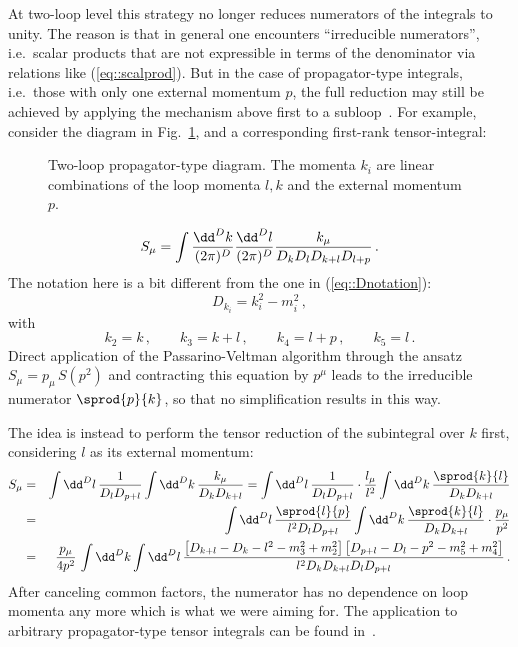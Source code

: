 At two-loop level this strategy no longer reduces numerators of the
integrals to unity. The reason is that in general one encounters
``irreducible numerators'', i.e.\ scalar products that are not
expressible in terms of the denominator via relations like
(\ref{eq::scalprod}).  But in the case of propagator-type integrals,
i.e.\ those with only one external momentum $p$, the full reduction may
still be achieved by applying the mechanism above first to a
subloop~\cite{WeiSchBoe94}.  For example, consider the diagram in
Fig.~\ref{tensred2l.ps}, and a corresponding first-rank tensor-integral:
%
\begin{figure}
  \begin{center}
    \leavevmode
    \hfill
    \parbox{\captionwidth}{
    \caption[]{\label{tensred2l.ps}\sloppy Two-loop propagator-type
      diagram. The momenta $k_i$ are linear combinations of the loop
      momenta $l,k$ and the external momentum $p$.  }}
  \end{center}
\end{figure}
%
\begin{equation}
S_\mu = \int{\dd^D k\over (2\pi)^D}{\dd^D l\over (2\pi)^D}{k_\mu\over
  D_k D_l D_{k+l} D_{l+p}} \,.
\end{equation}
The notation here is a bit different from the one in
(\ref{eq::Dnotation}):
\begin{equation}
D_{k_i} = k_i^2 - m_i^2\,,
\end{equation}
with
\begin{equation}
k_2 = k\,,\qquad k_3 = k+l\,,\qquad k_4 = l+p\,,\qquad k_5 = l\,.
\end{equation}
Direct
application of the Passarino-Veltman algorithm through the ansatz $S_\mu
= p_\mu \,S(p^2)$ and contracting this equation by $p^\mu$ leads to the
irreducible numerator $\sprod{p}{k}$, so that no simplification results
in this way.

The idea is instead to perform the tensor reduction of the subintegral
over $k$ first, considering $l$ as its external momentum:
\begin{eqnarray}
S_\mu &=&
\int{\dd^D l}\, {1\over D_l D_{p+l}}
\int{\dd^D k}\, {k_\mu\over D_k D_{k+l}} =
\int{\dd^D l}\, {1\over D_l D_{p+l}}\cdot{l_\mu\over l^2}
\int{\dd^D k}\, {\sprod{k}{l}\over D_k D_{k+l}}\nonumber\\&=&
\int{\dd^D l}\, {\sprod{l}{p}\over l^2 D_l D_{p+l}} 
\int{\dd^D k}\, {\sprod{k}{l}\over D_k D_{k+l}} 
\cdot{p_\mu\over p^2} \nonumber\\&=&
 {p_\mu\over 4 p^2} \,\int{\dd^D k}\int{\dd^D l}\, 
 {\left[D_{k+l} - D_k - l^2 - m_3^2 + m_2^2\right]
 \left[D_{p+l} - D_l - p^2 - m_5^2 + m_4^2\right]\over
   l^2 D_k D_{k+l} D_l D_{p+l}}\,.
\end{eqnarray}
After canceling common factors, the numerator has no dependence on loop
momenta any more which is what we were aiming for. The application to
arbitrary propagator-type tensor integrals can be found
in~\cite{WeiSchBoe94}.

